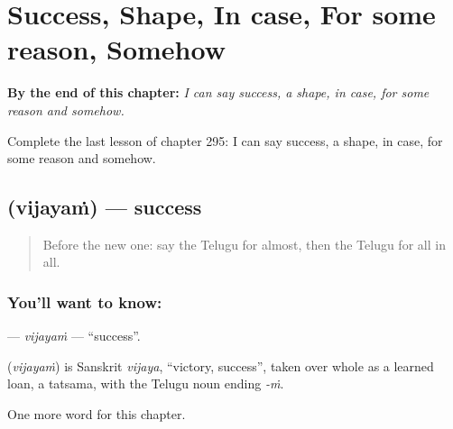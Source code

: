 
\chapter{Success, Shape, In case, For some reason, Somehow}
\label{ch:te-success-shape-in-case-for-some-reason-somehow}

\begin{chapteropening}
\textbf{By the end of this chapter:} \emph{I can say success, a shape, in case, for some reason and somehow.}

Complete the last lesson of chapter 295: I can say success, a shape, in case, for some reason and somehow.
\end{chapteropening}

\section[\texorpdfstring{\te{విజయం} (vijayaṁ)}{విజయం (vijayaṁ)}]{ (vijayaṁ) — success}

\label{lesson:TE-C295-vijayam}



\begin{quote}
Before the new one: say the Telugu for almost, then the Telugu for all in all.
\end{quote}

\subsection*{You'll want to know: }
\textbf{} — \emph{vijayaṁ} — \textquotedblleft{}success\textquotedblright{}.

\begin{cousinweb}
\textbf{} (\emph{vijayaṁ}) is Sanskrit \emph{vijaya}, \textquotedblleft{}victory, success\textquotedblright{}, taken over whole as a learned loan, a tatsama, with the Telugu noun ending \emph{-ṁ}.
\end{cousinweb}

\begin{grammarlens}[title={What you've built}]
One more word for this chapter.
\end{grammarlens}

